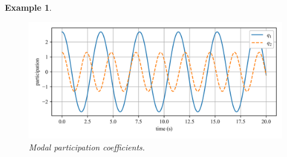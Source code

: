 \documentclass[12pt,letter]{article}
\newtheorem{ex}{Example}
\numberwithin{ex}{section} %
\newenvironment{example}{\begin{mdframed}[middlelinewidth=0.5mm]\begin{ex}\normalfont}{\end{ex}\end{mdframed}}
\numberwithin{re}{section} %
\begin{document}
\begin{example}
\begin{figure}[H]
	\centering
	\includegraphics[width=\linewidth]{../Figures/modal_analysis_free_participation_factors.png}
	\caption{Modal participation coefficients.}
	\label{fig:modal_analysis_free_participation_factors}
\end{figure}



\end{example}
\end{document}
